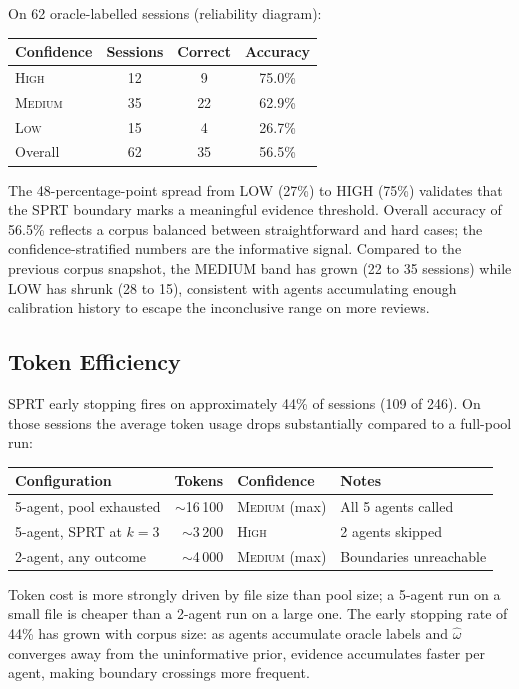 \documentclass[11pt,a4paper]{article}
\begin{document}
On 62 oracle-labelled sessions (reliability diagram):

\begin{center}
\begin{tabular}{lccc}
\toprule
Confidence & Sessions & Correct & Accuracy \\
\midrule
\textsc{High}   & 12 &  9 & 75.0\% \\
\textsc{Medium} & 35 & 22 & 62.9\% \\
\textsc{Low}    & 15 &  4 & 26.7\% \\
\midrule
Overall         & 62 & 35 & 56.5\% \\
\bottomrule
\end{tabular}
\end{center}

The 48-percentage-point spread from LOW (27\%) to HIGH (75\%) validates
that the SPRT boundary marks a meaningful evidence threshold. Overall
accuracy of 56.5\% reflects a corpus balanced between straightforward and
hard cases; the confidence-stratified numbers are the informative signal.
Compared to the previous corpus snapshot, the MEDIUM band has grown (22
to 35 sessions) while LOW has shrunk (28 to 15), consistent with agents
accumulating enough calibration history to escape the inconclusive range
on more reviews.

\subsection{Token Efficiency}

SPRT early stopping fires on approximately 44\% of sessions (109 of 246).
On those sessions the average token usage drops substantially compared to a
full-pool run:

\begin{center}
\begin{tabular}{lrll}
\toprule
Configuration & Tokens & Confidence & Notes \\
\midrule
5-agent, pool exhausted        & $\sim$16\,100 & \textsc{Medium} (max) & All 5 agents called \\
5-agent, SPRT at $k=3$         & $\sim$3\,200  & \textsc{High}         & 2 agents skipped \\
2-agent, any outcome           & $\sim$4\,000  & \textsc{Medium} (max) & Boundaries unreachable \\
\bottomrule
\end{tabular}
\end{center}

Token cost is more strongly driven by file size than pool size; a 5-agent
run on a small file is cheaper than a 2-agent run on a large one. The early
stopping rate of 44\% has grown with corpus size: as agents accumulate
oracle labels and $\hat\omega$ converges away from the uninformative prior,
evidence accumulates faster per agent, making boundary crossings more frequent.
\end{document}
